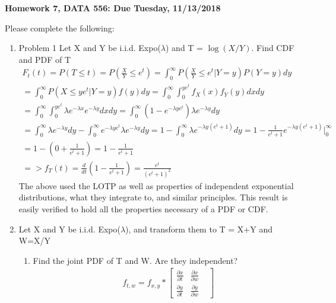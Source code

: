 \documentclass[11pt]{article}
\begin{document}
\begin{title}
	{\Large\bf Homework 7, DATA 556: Due Tuesday, 11/13/2018}
\end{title}

\author{\bf Alexander Van Roijen}

\maketitle

\newpage
Please complete the following:
\begin{enumerate}
\item Problem 1
Let X and Y be i.i.d. Expo($\lambda$) and T = $\log(X/Y)$. Find CDF and PDF of T
\begin{gather}
	F_t(t) = P(T\le t)=P(\frac{X}{Y}\le e^t) = \int_{0}^{\infty} P(\frac{X}{Y}\le e^t | Y=y) P(Y=y)dy \\
	= \int_{0}^{\infty} P(X \le ye^t | Y=y) f(y)dy =   \int_{0}^{\infty}\int_{0}^{ye^t} f_X(x) f_Y(y)dxdy \\
	= \int_{0}^{\infty} \int_{0}^{ye^t}  \lambda e^{-\lambda x} e^{-\lambda y} dxdy = \int_{0}^{\infty} (1-e^{-\lambda ye^t}) \lambda e^{-\lambda y} dy \\
	= \int_{0}^{\infty} \lambda e^{-\lambda y} dy - \int_{0}^{\infty} e^{-\lambda ye^t} \lambda e^{-\lambda y} dy = 1 - \int_{0}^{\infty} \lambda e^{-\lambda y(e^t +1)} dy = 1 - \frac{1}{e^t +1}e^{-\lambda y(e^t +1)}\big|_0^\infty\\
	= 1 - (0+\frac{1}{e^t +1}) = 1 - \frac{1}{e^t +1}\\
	=> f_T(t) = \frac{d}{dt} (1 - \frac{1}{e^t +1}) = \frac{e^t}{(e^t +1)^2}
\end{gather}
The above used the LOTP as well as properties of independent exponential distributions, what they integrate to, and similar principles. This result is easily verified to hold all the properties necessary of a PDF or CDF.
\item Let X and Y be i.i.d. Expo($\lambda$), and transform them to T = X+Y and W=X/Y
\begin{enumerate}
	\item Find the joint PDF of T and W. Are they independent?
	\begin{gather}
		f_{t,w}=f_{x,y} * \begin{bmatrix}
		\frac{\partial x}{\partial t} & 
		\frac{\partial x}{\partial w} \\
		\frac{\partial y}{\partial t} & 
		\frac{\partial y}{\partial w} & 
		\end{bmatrix}

\end{gather}
\end{enumerate}
\end{enumerate}
\end{document}
